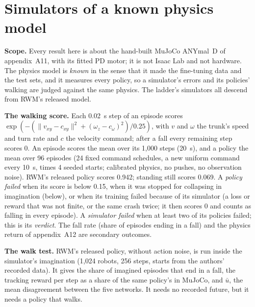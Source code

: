 \section{Simulators of a known physics model}\label{app:A13}
\textbf{Scope.} Every result here is about the hand-built MuJoCo ANYmal~D of appendix~A11, with its fitted PD motor;
it is not Isaac Lab and not hardware. The physics model is \emph{known} in the sense that it made the fine-tuning data
and the test sets, and it measures every policy, so a simulator's errors and its policies' walking are judged against
the same physics. The ladder's simulators all descend from RWM's released model.

\textbf{The walking score.} Each 0.02~s step of an episode scores
$\exp(-(\lVert v_{xy}-c_{xy}\rVert^2+(\omega_z-c_\omega)^2)/0.25)$, with $v$ and $\omega$ the trunk's speed and turn
rate and $c$ the velocity command; after a fall every remaining step scores 0. An episode scores the mean over its
1,000 steps (20~s), and a policy the mean over 96 episodes (24 fixed command schedules, a new uniform command every
10~s, times 4 seeded starts; calibrated physics, no pushes, no observation noise). RWM's released policy scores
0.942; standing still scores 0.069. A \emph{policy failed} when its score is below
0.15, when it was stopped for collapsing in imagination (below), or when its training failed because of its
simulator (a loss or reward that was not finite, or the same crash twice; it then scores 0 and counts as falling in
every episode). A \emph{simulator failed} when at least two of its policies failed; this is its \emph{verdict}. The fall
rate (share of episodes ending in a fall) and the physics return of appendix~A12 are secondary outcomes.

\textbf{The walk test.} RWM's released policy, without action noise, is run inside the simulator's imagination
(1,024 robots, 256 steps, starts from the authors' recorded data). It gives the share of imagined episodes that end in
a fall, the tracking reward per step as a share of the same policy's in MuJoCo, and $\bar u$, the mean disagreement
between the five networks. It needs no recorded future, but it needs a policy that walks.

